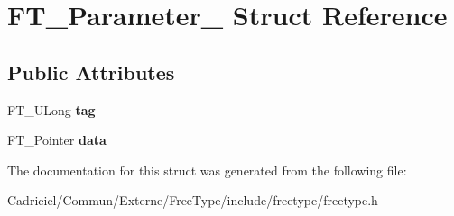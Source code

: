 \hypertarget{struct_f_t___parameter__}{\section{F\-T\-\_\-\-Parameter\-\_\- Struct Reference}
\label{struct_f_t___parameter__}
}
\subsection*{Public Attributes}
\begin{DoxyCompactItemize}
\item 
\hypertarget{struct_f_t___parameter___a5a53ef2652683a2cd9ee6a0a694cb76b}{F\-T\-\_\-\-U\-Long {\bfseries tag}}\label{struct_f_t___parameter___a5a53ef2652683a2cd9ee6a0a694cb76b}

\item 
\hypertarget{struct_f_t___parameter___a930c8885bd25be8d054443153c817c13}{F\-T\-\_\-\-Pointer {\bfseries data}}\label{struct_f_t___parameter___a930c8885bd25be8d054443153c817c13}

\end{DoxyCompactItemize}


The documentation for this struct was generated from the following file\-:\begin{DoxyCompactItemize}
\item 
Cadriciel/\-Commun/\-Externe/\-Free\-Type/include/freetype/freetype.\-h\end{DoxyCompactItemize}

